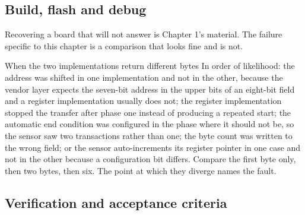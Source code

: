 \subsection*{Build, flash and debug}



Recovering a board that will not answer is Chapter 1's material. The failure
specific to this chapter is a comparison that looks fine and is not.

\begin{note}{When the two implementations return different bytes}
In order of likelihood: the address was shifted in one implementation and not in
the other, because the vendor layer expects the seven-bit address in the upper
bits of an eight-bit field and a register implementation usually does not; the
register implementation stopped the transfer after phase one instead of
producing a repeated start; the automatic end condition was configured in the
phase where it should not be, so the sensor saw two transactions rather than
one; the byte count was written to the wrong field; or the sensor auto-increments
its register pointer in one case and not in the other because a configuration
bit differs. Compare the first byte only, then two bytes, then six. The point at
which they diverge names the fault.
\end{note}

\subsection*{Verification and acceptance criteria}

